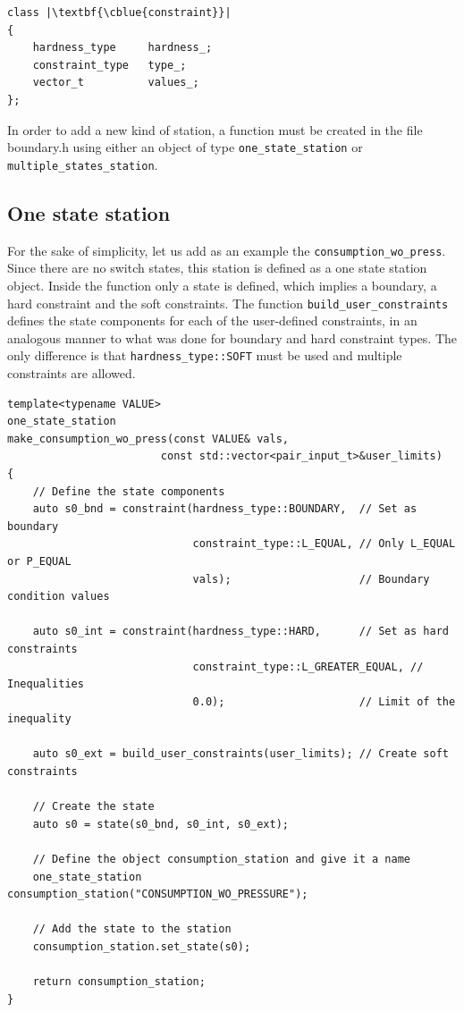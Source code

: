 \begin{verbatim}
class |\textbf{\cblue{constraint}}|
{
    hardness_type     hardness_;
    constraint_type   type_;
    vector_t          values_;
};
\end{verbatim}


In order to add a new kind of station, a function must be created in the file boundary.h using either an object of type \texttt{one\_state\_station} or \texttt{multiple\_states\_station}. 


\subsection{One state station}

For the sake of simplicity, let us add as an example the \texttt{consumption\_wo\_press}.  Since there are no switch states, this station is defined as a one state station object. Inside the function only a state is defined, which implies a boundary, a hard constraint and the soft constraints.
The function \texttt{build\_user\_constraints} defines the state components for each of the user-defined constraints, in an analogous manner to what was done for boundary and hard constraint types. The only difference is that \texttt{hardness\_type::SOFT} must be used and multiple constraints are allowed.
\begin{verbatim}
template<typename VALUE>
one_state_station
make_consumption_wo_press(const VALUE& vals,
                        const std::vector<pair_input_t>&user_limits)
{
    // Define the state components
    auto s0_bnd = constraint(hardness_type::BOUNDARY,  // Set as boundary 
                             constraint_type::L_EQUAL, // Only L_EQUAL or P_EQUAL 
                             vals);                    // Boundary condition values 

    auto s0_int = constraint(hardness_type::HARD,      // Set as hard constraints             
                             constraint_type::L_GREATER_EQUAL, // Inequalities 
                             0.0);                     // Limit of the inequality
    
    auto s0_ext = build_user_constraints(user_limits); // Create soft constraints

    // Create the state
    auto s0 = state(s0_bnd, s0_int, s0_ext);
    
    // Define the object consumption_station and give it a name
    one_state_station    consumption_station("CONSUMPTION_WO_PRESSURE"); 
    
    // Add the state to the station
    consumption_station.set_state(s0);

    return consumption_station;
}
    \end{verbatim}

